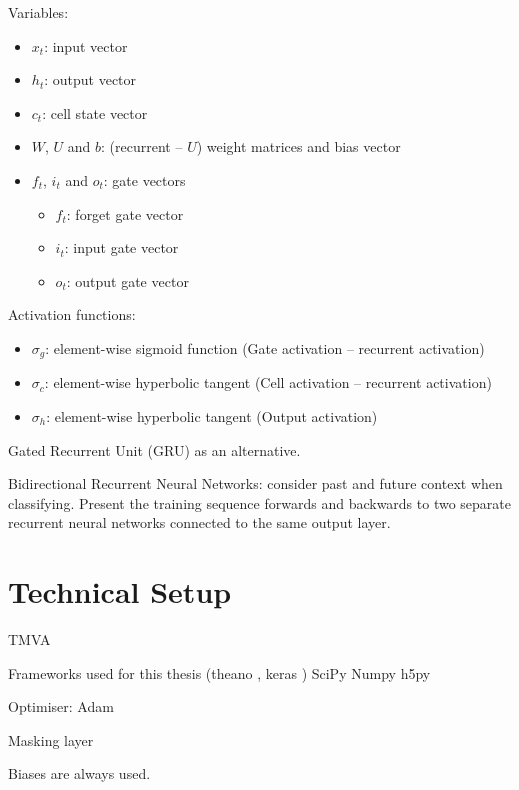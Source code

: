 Variables:
\begin{itemize}
\item $x_t$: input vector
\item $h_t$: output vector
\item $c_t$: cell state vector
\item $W$, $U$ and $b$: (recurrent -- $U$) weight matrices and bias vector
\item $f_t$, $i_t$ and $o_t$: gate vectors
  \begin{itemize}
  \item $f_t$: forget gate vector
  \item $i_t$: input gate vector
  \item $o_t$: output gate vector
  \end{itemize}
\end{itemize}

Activation functions:
\begin{itemize}
\item $\sigma_g$: element-wise sigmoid function (Gate activation -- recurrent
  activation)
\item $\sigma_c$: element-wise hyperbolic tangent (Cell activation -- recurrent
  activation)
\item $\sigma_h$: element-wise hyperbolic tangent (Output activation)
\end{itemize}

Gated Recurrent Unit (GRU) as an alternative.

Bidirectional Recurrent Neural Networks: consider past and future context when
classifying. Present the training sequence forwards and backwards to two
separate recurrent neural networks connected to the same output layer.

\section{Technical Setup}
\label{sec:tech_setup}

TMVA

Frameworks used for this thesis (theano \cite{theano}, keras \cite{keras})
SciPy \cite{scipy}
Numpy \cite{numpy}
h5py

Optimiser: Adam

Masking layer

Biases are always used.

